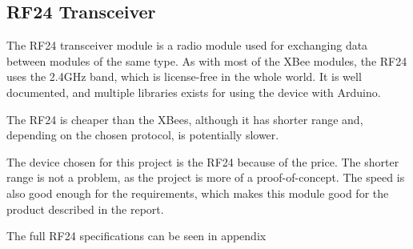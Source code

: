 \subsection{RF24 Transceiver}
The RF24 transceiver module is a radio module used for exchanging data between modules of the same type. As with most of the XBee modules, the RF24 uses the 2.4GHz band, which is license-free in the whole world. It is well documented, and multiple libraries exists for using the device with Arduino.

The RF24 is cheaper than the XBees, although it has shorter range and, depending on the chosen protocol, is potentially slower.

The device chosen for this project is the RF24 because of the price. The shorter range is not a problem, as the project is more of a proof-of-concept. The speed is also good enough for the requirements, which makes this module good for the product described in the report.

The full RF24 specifications can be seen in appendix 

